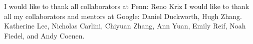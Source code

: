 


I would like to thank all collaborators at Penn: Reno Kriz
I would like to thank all my collaborators and mentors at Google: Daniel Duckworth, Hugh Zhang. Katherine Lee, Nicholas Carlini, Chiyuan Zhang, Ann Yuan, Emily Reif, Noah Fiedel, and Andy Coenen.

